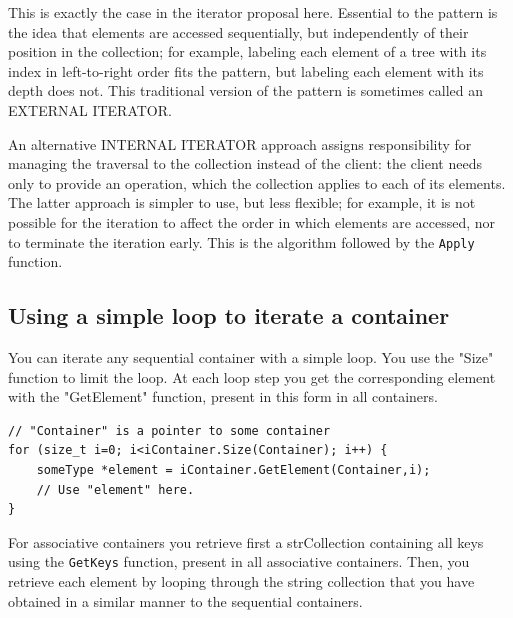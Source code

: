 \documentclass[12pt,a4paper]{memoir} %
\begin{document}
This is exactly the case in the iterator proposal here. Essential to the pattern is the idea that elements are accessed sequentially, but independently of their position in the collection; for example, labeling each element of a tree with its index in left-to-right order fits the pattern, but labeling each element with its depth does not. This traditional version of the pattern is sometimes called an EXTERNAL ITERATOR. 

An alternative INTERNAL ITERATOR approach assigns responsibility for managing the traversal to the collection instead of the client: the client needs only to provide an operation, which the collection applies to each of its elements. The latter approach is simpler to use, but less flexible; for example, it is not possible for the iteration to affect the order in which elements are accessed, nor to terminate the iteration early. This is the algorithm followed by the \verb,Apply, function.

\subsection{Using a simple loop to iterate a container}

You can iterate any sequential container with a simple loop. You use the "Size" function to limit the loop. At each loop step you get the corresponding 
element with the "GetElement" function, present in this form in all containers.
\begin{verbatim}
// "Container" is a pointer to some container
for (size_t i=0; i<iContainer.Size(Container); i++) {
    someType *element = iContainer.GetElement(Container,i);
    // Use "element" here.
}
\end{verbatim}
For associative containers you retrieve first a strCollection containing all keys using the \texttt{GetKeys} function, present in all associative 
containers. Then, you retrieve each element by looping through the string collection that you have obtained in a similar manner to the sequential 
containers. 
\end{document}
